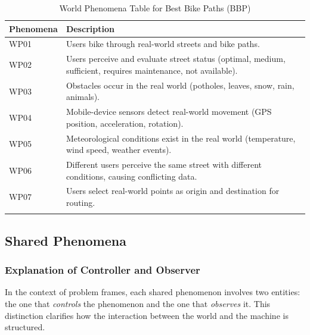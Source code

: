 \begin{longtable}{|l|p{}|}
    \hline
    \textbf{Phenomena} & \textbf{Description} \\
    \hline \hline

    WP01 & Users bike through real-world streets and bike paths. \\
    \hline
    WP02 & Users perceive and evaluate street status (optimal, medium, sufficient, requires maintenance, not available). \\
    \hline
    WP03 & Obstacles occur in the real world (potholes, leaves, snow, rain, animals). \\
    \hline
    WP04 & Mobile-device sensors detect real-world movement (GPS position, acceleration, rotation). \\
    \hline
    WP05 & Meteorological conditions exist in the real world (temperature, wind speed, weather events). \\
    \hline
    WP06 & Different users perceive the same street with different conditions, causing conflicting data. \\
    \hline
    WP07 & Users select real-world points as origin and destination for routing. \\
    \hline

    \caption{World Phenomena Table for Best Bike Paths (BBP)}

    \label{tab:world-phenomena}
\end{longtable}

\pagebreak

\subsection{Shared Phenomena}
\label{subsec:shared-phenomena}%
\subsubsection*{Explanation of Controller and Observer}

In the context of problem frames, each shared phenomenon involves two entities: 
the one that \textit{controls} the phenomenon and the one that \textit{observes} it. 
This distinction clarifies how the interaction between the world and the machine is structured.



